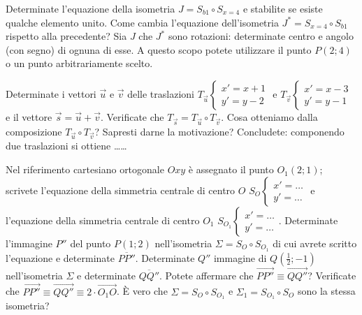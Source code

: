 \begin{esercizio}
  \label{ese:8.73} %
  Determinate l'equazione della isometria $J=S_{b1} \circ S_{x=4}$ e 
  stabilite se esiste qualche elemento unito. Come cambia l'equazione 
  dell'isometria $J^*=S_{x=4} \circ S_{b1}$ rispetto alla precedente? 
  Sia $J$ che $J^*$ sono rotazioni: determinate centro e angolo (con 
  segno) di ognuna di esse. A questo scopo potete utilizzare il punto 
  $P(2;4)$ o un punto arbitrariamente scelto.
\end{esercizio}

\begin{esercizio}
  \label{ese:8.77} %
  Determinate i vettori $\vec{u}$ e $\vec{v}$ delle traslazioni 
  $T_{\vec{u}}\begin{cases}x'=x+1\\y'=y-2\end{cases}$ e 
  $T_{\vec{v}}\begin{cases}x'=x-3\\y'=y-1\end{cases}$ e il vettore 
  $\vec{s} = \vec{u} + \vec{v}$. Verificate che $T_{\vec{s}} = 
  T_{\vec{u}} \circ T_{\vec{v}}$.
  Cosa otteniamo dalla composizione $T_{\vec{u}} \circ T_{\vec{v}}$? 
  Sapresti darne la motivazione?
  Concludete: componendo due traslazioni si ottiene \ldots\ldots{}
\end{esercizio}

\begin{esercizio}
  \label{ese:8.78} %
  Nel riferimento cartesiano ortogonale $Oxy$ è assegnato il punto 
  $O_1(2;1)$; scrivete l'equazione della simmetria centrale di centro 
  $O$ $S_O\begin{cases}x'=\ldots{}\\y'=\ldots{}\end{cases}$  e 
  l'equazione della simmetria centrale di centro $O_1$ 
  $S_{O_1}\begin{cases}x'=\ldots{}\\y'=\ldots{}\end{cases}$. 
  Determinate l'immagine $P''$ del punto $P(1;2)$ nell'isometria 
  $\Sigma=S_O \circ S_{O_1}$ di cui avrete scritto l'equazione e 
  determinate $\overline{PP''}$. Determinate $Q''$ immagine di 
  $Q\left(\frac{1}{2};-1\right)$ nell'isometria $\Sigma$ e determinate 
  $\overline{QQ''}$. Potete affermare che $\overrightarrow{PP''} \equiv 
  \overrightarrow{QQ''}$? Verificate che $\overrightarrow{PP''} \equiv 
  \overrightarrow{QQ''} \equiv 2\cdot \overrightarrow{O_1O}$.
  \`E vero che $\Sigma=S_O \circ S_{O_1}$ e $\Sigma_1=S_{O_1} \circ 
  S_{O}$ sono la stessa isometria?
\end{esercizio}

